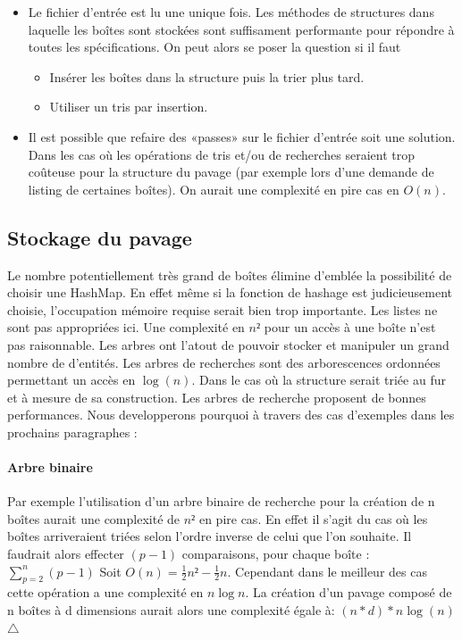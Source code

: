 \begin{itemize}
\item
  Le fichier d'entrée est lu une unique fois. Les méthodes  de structures dans laquelle les boîtes sont stockées sont suffisament performante pour répondre à toutes les spécifications. On peut alors se poser la question si il faut 
  \begin{itemize}
  \item
    Insérer les boîtes dans la structure puis la trier plus tard.
  \item
    Utiliser un tris par insertion.
  \end{itemize}
\item
  Il est possible que refaire des «passes» sur le fichier d'entrée soit une solution. Dans les cas où les opérations de tris et/ou de recherches seraient trop coûteuse pour la structure du pavage (par exemple lors d'une demande de listing de certaines boîtes). On aurait une complexité en pire cas en $O(n)$. 
\end{itemize}
\subsection{Stockage du pavage}
Le nombre potentiellement très grand de boîtes élimine d'emblée la possibilité de choisir une HashMap. En effet même si la fonction de hashage est judicieusement choisie, l'occupation mémoire requise serait bien trop importante. Les listes ne sont pas  appropriées ici. Une complexité en $n²$ pour un accès à une boîte n'est pas raisonnable. Les arbres ont l'atout de pouvoir stocker et manipuler un grand nombre de d'entités. Les arbres de recherches sont des arborescences ordonnées permettant un accès en $\log(n)$. Dans le cas où la structure serait triée au fur et à mesure de sa construction. Les arbres de recherche proposent de bonnes performances. Nous developperons pourquoi à travers des cas d'exemples dans les prochains paragraphes : 



\paragraph{Arbre binaire}
Par exemple l'utilisation d'un arbre binaire de recherche pour la création de n boîtes aurait une complexité de $n²$ en pire cas. En effet il s'agit du cas où les boîtes arriveraient triées selon l'ordre inverse de celui que l'on souhaite. Il faudrait alors effecter $(p-1)$ comparaisons, pour chaque boîte :  $\sum_{p=2}^{n}(p-1)$  Soit $O(n)=\frac{1}{2}n²-\frac{1}{2}n$. Cependant dans le meilleur des cas cette opération a une complexité en $n\log{n}$.
La création d'un pavage composé de n boîtes à d dimensions aurait alors une complexité égale à: $(n*d)*n\log(n)$ $\triangle$

